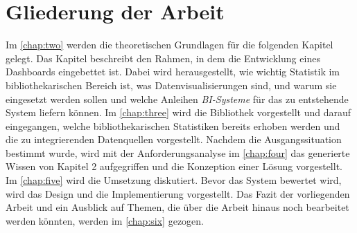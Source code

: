 \section{Gliederung der Arbeit}
Im \autoref{chap:two} werden die theoretischen Grundlagen für die folgenden Kapitel gelegt. 
Das Kapitel beschreibt den Rahmen, in dem die Entwicklung eines Dashboards eingebettet ist. Dabei wird herausgestellt, wie wichtig Statistik
im bibliothekarischen Bereich ist, was Datenvisualisierungen sind, und warum sie eingesetzt werden sollen und welche Anleihen \textit{\acrshort{BI}-Systeme} 
für das zu entstehende System liefern können. Im \autoref{chap:three}
wird die Bibliothek vorgestellt und darauf eingegangen, welche bibliothekarischen Statistiken bereits erhoben werden und die zu integrierenden Datenquellen vorgestellt.
Nachdem die Ausgangssituation bestimmt wurde, wird mit der Anforderungsanalyse  im \autoref{chap:four} das generierte Wissen von Kapitel 2
aufgegriffen und die Konzeption einer Lösung vorgestellt.
Im \autoref{chap:five} wird die Umsetzung diskutiert. Bevor das System bewertet wird, wird das Design und die Implementierung vorgestellt.
Das Fazit der vorliegenden Arbeit und ein Ausblick auf Themen, die über die Arbeit hinaus noch bearbeitet werden könnten, werden im \autoref{chap:six} gezogen.
